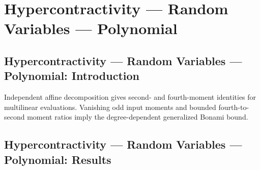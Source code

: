 \section{Hypercontractivity --- Random Variables --- Polynomial}
\subsection*{Hypercontractivity --- Random Variables --- Polynomial: Introduction}
Independent affine decomposition gives second- and fourth-moment identities for multilinear evaluations. Vanishing odd input moments and bounded fourth-to-second moment ratios imply the degree-dependent generalized Bonami bound.

\subsection*{Hypercontractivity --- Random Variables --- Polynomial: Results}

